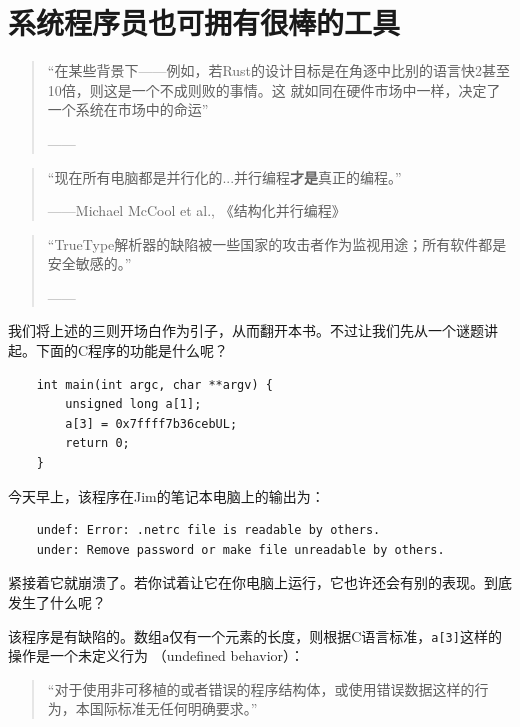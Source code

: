 \chapter{系统程序员也可拥有很棒的工具}\label{CHP1}

\begin{quote}
    “在某些背景下------例如，若Rust的设计目标是在角逐中比别的语言快2甚至10倍，则这是一个不成则败的事情。这
    就如同在硬件市场中一样，决定了一个系统在市场中的命运”
    \begin{flushright}
        ------
    \end{flushright}
\end{quote}
\begin{quote}
    “现在所有电脑都是并行化的...并行编程\textbf{才是}真正的编程。”
    \begin{flushright}
        ------Michael McCool et al., 《结构化并行编程》
    \end{flushright}
\end{quote}
\begin{quote}
    “TrueType解析器的缺陷被一些国家的攻击者作为监视用途；所有软件都是安全敏感的。”
    \begin{flushright}
        ------
    \end{flushright}
\end{quote}
我们将上述的三则开场白作为引子，从而翻开本书。不过让我们先从一个谜题讲起。下面的C程序的功能是什么呢？

\smallskip
\begin{verbatim}
    int main(int argc, char **argv) {
        unsigned long a[1];
        a[3] = 0x7ffff7b36cebUL;
        return 0;
    }
\end{verbatim}
\medskip
今天早上，该程序在Jim的笔记本电脑上的输出为：

\smallskip
\begin{verbatim}
    undef: Error: .netrc file is readable by others.
    under: Remove password or make file unreadable by others.
\end{verbatim}

\smallskip
紧接着它就崩溃了。若你试着让它在你电脑上运行，它也许还会有别的表现。到底发生了什么呢？

\medskip
该程序是有缺陷的。数组\texttt{a}仅有一个元素的长度，则根据C语言标准，\texttt{a[3]}这样的操作是一个未定义行为
（undefined behavior）：

\smallskip
\begin{quote}
    “对于使用非可移植的或者错误的程序结构体，或使用错误数据这样的行为，本国际标准无任何明确要求。”
\end{quote}

